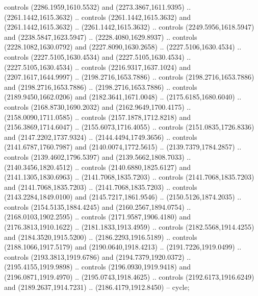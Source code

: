 \begin{scope}[shift={(19.44451,-318.97965)}]
\begin{scope}[shift={(-2093.8013,-1176.4989)}]
\begin{scope}
\begin{scope}
          controls (2286.1959,1610.5532) and (2273.3867,1611.9395) ..
          (2261.1442,1615.3632) .. controls (2261.1442,1615.3632) and
          (2261.1442,1615.3632) .. (2261.1442,1615.3632) .. controls
          (2249.5956,1618.5947) and (2238.5847,1623.5947) .. (2228.4080,1629.8937) ..
          controls (2228.1082,1630.0792) and (2227.8090,1630.2658) ..
          (2227.5106,1630.4534) .. controls (2227.5105,1630.4534) and
          (2227.5105,1630.4534) .. (2227.5105,1630.4534) .. controls
          (2216.9317,1637.1024) and (2207.1617,1644.9997) .. (2198.2716,1653.7886) ..
          controls (2198.2716,1653.7886) and (2198.2716,1653.7886) ..
          (2198.2716,1653.7886) .. controls (2189.9450,1662.0206) and
          (2182.3641,1671.0048) .. (2175.6185,1680.6040) .. controls
          (2168.8730,1690.2032) and (2162.9649,1700.4175) .. (2158.0090,1711.0585) ..
          controls (2157.1878,1712.8218) and (2156.3869,1714.6047) ..
          (2155.6073,1716.4055) .. controls (2151.0835,1726.8336) and
          (2147.2202,1737.9324) .. (2144.4494,1749.3656) .. controls
          (2141.6787,1760.7987) and (2140.0074,1772.5615) .. (2139.7379,1784.2857) ..
          controls (2139.4602,1796.5397) and (2139.5662,1808.7033) ..
          (2140.3456,1820.4512) .. controls (2140.6880,1825.6127) and
          (2141.1305,1830.6963) .. (2141.7068,1835.7203) .. controls
          (2141.7068,1835.7203) and (2141.7068,1835.7203) .. (2141.7068,1835.7203) ..
          controls (2143.2284,1849.0100) and (2145.7217,1861.9546) ..
          (2150.5126,1874.2035) .. controls (2154.5135,1884.4245) and
          (2160.2567,1894.0754) .. (2168.0103,1902.2595) .. controls
          (2171.9587,1906.4180) and (2176.3813,1910.1622) .. (2181.1833,1913.4959) ..
          controls (2182.5568,1914.4255) and (2184.3520,1915.5200) ..
          (2186.2293,1916.5189) .. controls (2188.1066,1917.5179) and
          (2190.0640,1918.4213) .. (2191.7226,1919.0499) .. controls
          (2193.3813,1919.6786) and (2194.7379,1920.0372) .. (2195.4155,1919.9898) ..
          controls (2196.0930,1919.9418) and (2196.0871,1919.4970) ..
          (2195.0743,1918.4625) .. controls (2192.6173,1916.6249) and
          (2189.2637,1914.7231) .. (2186.4179,1912.8450) -- cycle;


\end{scope}
\end{scope}
\end{scope}
\end{scope}
